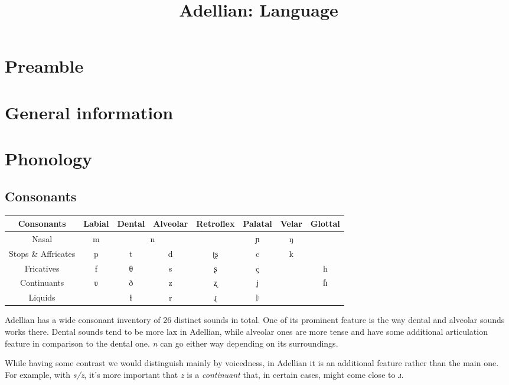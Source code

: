 \documentclass[12pt]{article}
\begin{document}
	\title{Adellian: Language}
	\maketitle
	
	\section{Preamble}
	
	
	
	\tableofcontents
	
	\section{General information}
	
	\section{Phonology}
	
	\subsection{Consonants}
	
	\begin{tabular}{||c | c c c c c c c||}
		Consonants & Labial & Dental & Alveolar &
		Retroflex & Palatal & Velar & Glottal \\
		\hline
		Nasal & m & \multicolumn{2}{c}{n} & & ɲ & ŋ & \\
		Stops \& Affricates & p & t & d & ʈʂ & c & k & \\
		Fricatives & f & θ & s & ʂ & ç & & h \\
		Continuants & ʋ & ð & z & ʐ & j & & ɦ \\
		Liquids & & ɫ & r & ɻ & lʲ & & \\		  
	\end{tabular}

	Adellian has a wide consonant inventory of 26 distinct sounds in total. One of its prominent feature is the way dental and alveolar sounds works there. Dental sounds tend to be more lax in Adellian, while alveolar ones are more tense and have some additional articulation feature in comparison to the dental one. \emph{n} can go either way depending on its surroundings.
	
	While having some contrast we would distinguish mainly by voicedness, in Adellian it is an additional feature rather than the main one. For example, with \emph{s/z}, it's more important that \emph{z} is a \emph{continuant} that, in certain cases, might come close to \emph{ɹ}.
	
\end{document}
